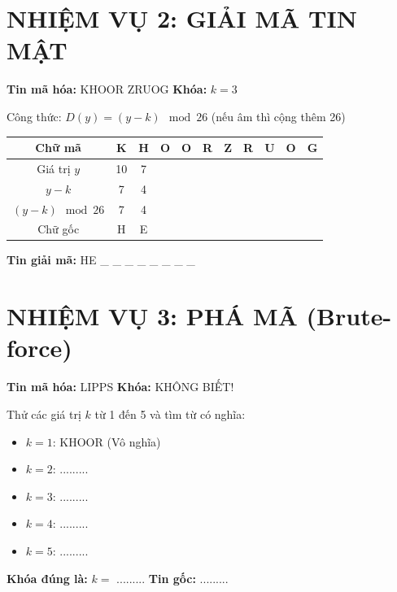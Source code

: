 \documentclass[12pt,a4paper]{article}
\begin{document}
\section*{\color{cryptogreen} NHIỆM VỤ 2: GIẢI MÃ TIN MẬT}
\textbf{Tin mã hóa:} KHOOR ZRUOG \quad \textbf{Khóa:} $k = 3$

Công thức: $D(y) = (y - k) \mod 26$ (nếu âm thì cộng thêm 26)

\begin{center}
\begin{tabular}{|c|c|c|c|c|c|c|c|c|c|c|}
\hline
Chữ mã & K & H & O & O & R & Z & R & U & O & G \\
\hline
Giá trị $y$ & 10 & 7 & & & & & & & & \\
\hline
$y - k$ & 7 & 4 & & & & & & & & \\
\hline
$(y-k) \mod 26$ & 7 & 4 & & & & & & & & \\
\hline
Chữ gốc & H & E & & & & & & & & \\
\hline
\end{tabular}
\end{center}
\textbf{Tin giải mã:} HE \_ \_ \_ \quad \_ \_ \_ \_ \_

\section*{\color{cryptogreen} NHIỆM VỤ 3: PHÁ MÃ (Brute-force)}
\textbf{Tin mã hóa:} LIPPS \quad \textbf{Khóa:} KHÔNG BIẾT!

Thử các giá trị $k$ từ 1 đến 5 và tìm từ có nghĩa:
\begin{itemize}
    \item $k=1$: KHOOR (Vô nghĩa)
    \item $k=2$: ......... 
    \item $k=3$: .........
    \item $k=4$: .........
    \item $k=5$: .........
\end{itemize}
\textbf{Khóa đúng là:} $k = $ ......... \quad \textbf{Tin gốc:} .........
\end{document}
